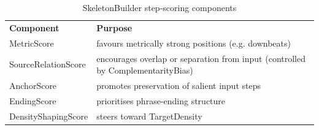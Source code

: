 \begin{longtable}[]{@{}
  >{\raggedright\arraybackslash}p{}
  >{\raggedright\arraybackslash}p{}@{}}
\caption{SkeletonBuilder step-scoring components}\label{tab:skeleton-step-scoring-components}\\
\toprule\noalign{}
\begin{minipage}[b]{\linewidth}\centering
\textbf{Component}
\end{minipage} & \begin{minipage}[b]{\linewidth}\centering
\textbf{Purpose}
\end{minipage} \\
\begin{minipage}[b]{\linewidth}\raggedright
MetricScore
\end{minipage} & \begin{minipage}[b]{\linewidth}\raggedright
favours metrically strong positions (e.g. downbeats)
\end{minipage} \\
\begin{minipage}[b]{\linewidth}\raggedright
SourceRelationScore
\end{minipage} & \begin{minipage}[b]{\linewidth}\raggedright
encourages overlap or separation from input (controlled by
ComplementarityBias)
\end{minipage} \\
\begin{minipage}[b]{\linewidth}\raggedright
AnchorScore
\end{minipage} & \begin{minipage}[b]{\linewidth}\raggedright
promotes preservation of salient input steps
\end{minipage} \\
\begin{minipage}[b]{\linewidth}\raggedright
EndingScore
\end{minipage} & \begin{minipage}[b]{\linewidth}\raggedright
prioritises phrase-ending structure
\end{minipage} \\
\begin{minipage}[b]{\linewidth}\raggedright
DensityShapingScore
\end{minipage} & \begin{minipage}[b]{\linewidth}\raggedright
steers toward TargetDensity
\end{minipage} \\

\end{longtable}
